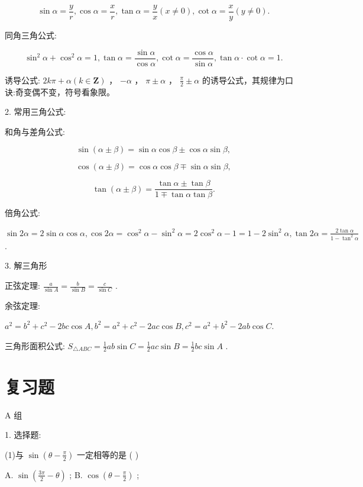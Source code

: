 \documentclass[10pt]{article}
\begin{document}
\[
\sin \alpha  = \frac{y}{r},\cos \alpha  = \frac{x}{r},\tan \alpha  = \frac{y}{x}\left( {x \neq  0}\right) ,\cot \alpha  = \frac{x}{y}\left( {y \neq  0}\right) .
\]

同角三角公式:

\[
{\sin }^{2}\alpha  + {\cos }^{2}\alpha  = 1,\tan \alpha  = \frac{\sin \alpha }{\cos \alpha },\cot \alpha  = \frac{\cos \alpha }{\sin \alpha },\tan \alpha  \cdot  \cot \alpha  = 1.
\]

诱导公式: \({2k\pi } + \alpha \left( {k \in  \mathbf{Z}}\right)\) ， \(- \alpha\) ， \(\pi  \pm  \alpha\) ， \(\frac{\pi }{2} \pm  \alpha\) 的诱导公式，其规律为口诀:奇变偶不变，符号看象限。

2. 常用三角公式:

和角与差角公式:

\[
\sin \left( {\alpha  \pm  \beta }\right)  = \sin \alpha \cos \beta  \pm  \cos \alpha \sin \beta ,
\]

\[
\cos \left( {\alpha  \pm  \beta }\right)  = \cos \alpha \cos \beta  \mp  \sin \alpha \sin \beta ,
\]

\[
\tan \left( {\alpha  \pm  \beta }\right)  = \frac{\tan \alpha  \pm  \tan \beta }{1 \mp  \tan \alpha \tan \beta }.
\]

倍角公式:

\(\sin {2\alpha } = 2\sin \alpha \cos \alpha ,\cos {2\alpha } = {\cos }^{2}\alpha  - {\sin }^{2}\alpha  = 2{\cos }^{2}\alpha  - 1 = 1 - 2{\sin }^{2}\alpha ,\tan {2\alpha } = \frac{2\tan \alpha }{1 - {\tan }^{2}\alpha }\) .

3. 解三角形

正弦定理: \(\frac{a}{\sin A} = \frac{b}{\sin B} = \frac{c}{\sin C}\) .

余弦定理:

\({a}^{2} = {b}^{2} + {c}^{2} - {2bc}\cos A,{b}^{2} = {a}^{2} + {c}^{2} - {2ac}\cos B,{c}^{2} = {a}^{2} + {b}^{2} - {2ab}\cos C.\)

三角形面积公式: \({S}_{\bigtriangleup {ABC}} = \frac{1}{2}{ab}\sin C = \frac{1}{2}{ac}\sin B = \frac{1}{2}{bc}\sin A\) .

\section*{复习题}

A 组

1. 选择题:

(1)与 \(\sin \left( {\theta  - \frac{\pi }{2}}\right)\) 一定相等的是 ( )

A. \(\sin \left( {\frac{3\pi }{2} - \theta }\right)\) ; B. \(\cos \left( {\theta  - \frac{\pi }{2}}\right)\) ;
\end{document}
